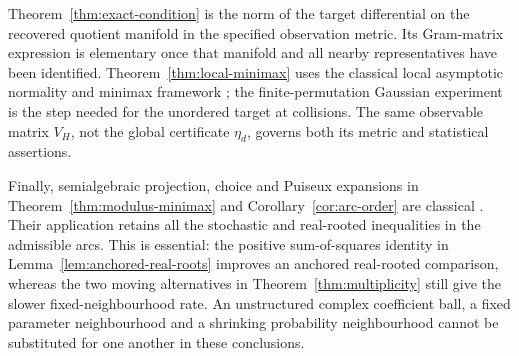 Theorem~\ref{thm:exact-condition} is the norm of the target differential
on the recovered quotient manifold in the specified observation metric.
Its Gram-matrix expression is elementary once that manifold and all
nearby representatives have been identified. Theorem~\ref{thm:local-minimax}
uses the classical local asymptotic normality and minimax framework
\cite{Hajek72,vdV98}; the finite-permutation Gaussian experiment is the
step needed for the unordered target at collisions. The same observable
matrix $V_H$, not the global certificate $\eta_d$, governs both its
metric and statistical assertions.

Finally, semialgebraic projection, choice and Puiseux expansions in
Theorem~\ref{thm:modulus-minimax} and Corollary~\ref{cor:arc-order} are
classical \cite{BCR98,BPR06}. Their application retains all the stochastic
and real-rooted inequalities in the admissible arcs. This is essential:
the positive sum-of-squares identity in
Lemma~\ref{lem:anchored-real-roots} improves an anchored real-rooted
comparison, whereas the two moving alternatives in
Theorem~\ref{thm:multiplicity} still give the slower fixed-neighbourhood
rate. An unstructured complex coefficient ball, a fixed parameter
neighbourhood and a shrinking probability neighbourhood cannot be
substituted for one another in these conclusions.
